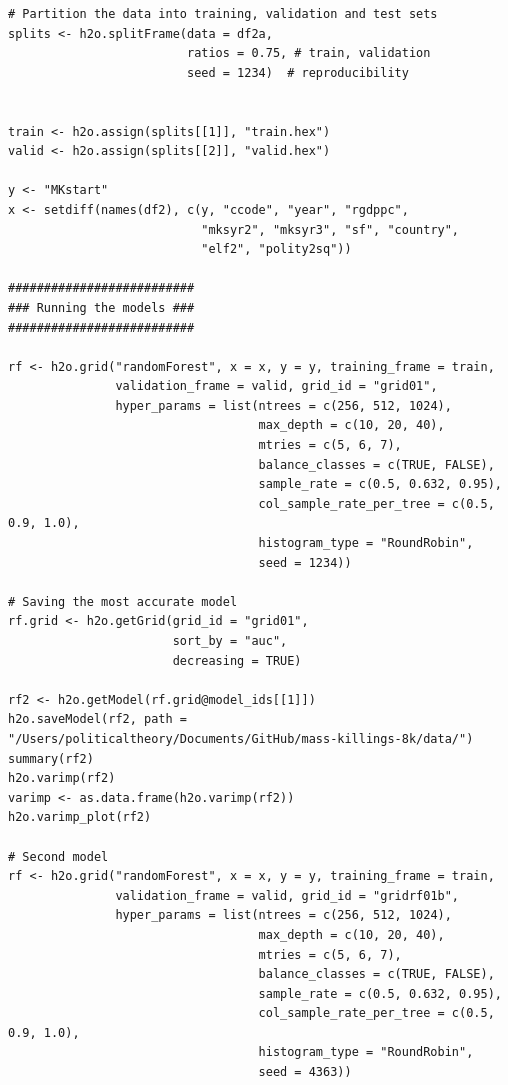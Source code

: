 \begin{verbatim}
# Partition the data into training, validation and test sets
splits <- h2o.splitFrame(data = df2a, 
                         ratios = 0.75, # train, validation
                         seed = 1234)  # reproducibility


train <- h2o.assign(splits[[1]], "train.hex")   
valid <- h2o.assign(splits[[2]], "valid.hex") 

y <- "MKstart"
x <- setdiff(names(df2), c(y, "ccode", "year", "rgdppc",
                           "mksyr2", "mksyr3", "sf", "country",
                           "elf2", "polity2sq")) 

##########################
### Running the models ###
##########################

rf <- h2o.grid("randomForest", x = x, y = y, training_frame = train, 
               validation_frame = valid, grid_id = "grid01",
               hyper_params = list(ntrees = c(256, 512, 1024),
                                   max_depth = c(10, 20, 40),
                                   mtries = c(5, 6, 7),
                                   balance_classes = c(TRUE, FALSE),
                                   sample_rate = c(0.5, 0.632, 0.95),
                                   col_sample_rate_per_tree = c(0.5, 0.9, 1.0),
                                   histogram_type = "RoundRobin",
                                   seed = 1234)) 

# Saving the most accurate model
rf.grid <- h2o.getGrid(grid_id = "grid01",
                       sort_by = "auc",
                       decreasing = TRUE)

rf2 <- h2o.getModel(rf.grid@model_ids[[1]])
h2o.saveModel(rf2, path = "/Users/politicaltheory/Documents/GitHub/mass-killings-8k/data/")
summary(rf2)
h2o.varimp(rf2)
varimp <- as.data.frame(h2o.varimp(rf2))
h2o.varimp_plot(rf2)

# Second model
rf <- h2o.grid("randomForest", x = x, y = y, training_frame = train, 
               validation_frame = valid, grid_id = "gridrf01b",
               hyper_params = list(ntrees = c(256, 512, 1024),
                                   max_depth = c(10, 20, 40),
                                   mtries = c(5, 6, 7),
                                   balance_classes = c(TRUE, FALSE),
                                   sample_rate = c(0.5, 0.632, 0.95),
                                   col_sample_rate_per_tree = c(0.5, 0.9, 1.0),
                                   histogram_type = "RoundRobin",
                                   seed = 4363))


\end{verbatim}
